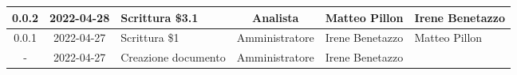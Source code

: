 \begin{center}
\begin{longtable}{ |c|c|p{8em}|c|m{5em}|m{5em}| }
	\hline
    0.0.2 & 2022-04-28 & Scrittura \$3.1 & Analista & Matteo \newline Pillon & Irene \newline Benetazzo\\
	\hline
	0.0.1 & 2022-04-27 & Scrittura \$1 & Amministratore & Irene \newline Benetazzo & Matteo \newline Pillon\\
	\hline
	- & 2022-04-27 & Creazione \newline documento & Amministratore & Irene \newline Benetazzo & \\
	\hline
	\end{longtable}
	\end{center}
	\newpage